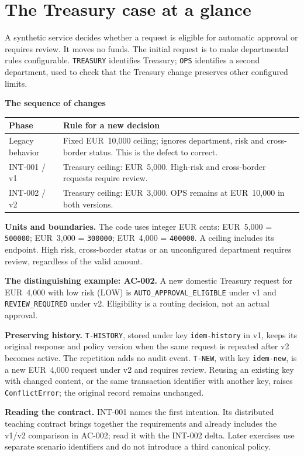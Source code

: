 \clearpage
\begingroup
\small
\section*{The Treasury case at a glance}\label{case:canonical-card}

A synthetic service decides whether a request is eligible for automatic approval or requires review. It moves no funds. The initial request is to make departmental rules configurable. \texttt{TREASURY} identifies Treasury; \texttt{OPS} identifies a second department, used to check that the Treasury change preserves other configured limits.

\noindent\textbf{The sequence of changes}
\begin{center}
\begin{tabularx}{\linewidth}{@{}p{.25\linewidth}X@{}}\toprule
Phase & Rule for a new decision\\\midrule
Legacy behavior & Fixed EUR~10,000 ceiling; ignores department, risk and cross-border status. This is the defect to correct.\\
\mbox{INT-001} / v1 & Treasury ceiling: EUR~5,000. High-risk and cross-border requests require review.\\
\mbox{INT-002} / v2 & Treasury ceiling: EUR~3,000. OPS remains at EUR~10,000 in both versions.\\\bottomrule
\end{tabularx}
\end{center}

\noindent\textbf{Units and boundaries.} The code uses integer EUR cents: EUR~5,000 = \texttt{500000}; EUR~3,000 = \texttt{300000}; EUR~4,000 = \texttt{400000}. A ceiling includes its endpoint. High risk, cross-border status or an unconfigured department requires review, regardless of the valid amount.

\noindent\textbf{The distinguishing example: \mbox{AC-002}.} A new domestic Treasury request for EUR~4,000 with low risk (LOW) is \texttt{AUTO\_APPROVAL\_ELIGIBLE} under v1 and \texttt{REVIEW\_REQUIRED} under v2. Eligibility is a routing decision, not an actual approval.

\noindent\textbf{Preserving history.} \texttt{T-HISTORY}, stored under key \texttt{idem-history} in v1, keeps its original response and policy version when the same request is repeated after v2 becomes active. The repetition adds no audit event. \texttt{T-NEW}, with key \texttt{idem-new}, is a new EUR~4,000 request under v2 and requires review. Reusing an existing key with changed content, or the same transaction identifier with another key, raises \texttt{ConflictError}; the original record remains unchanged.

\noindent\textbf{Reading the contract.} \mbox{INT-001} names the first intention. Its distributed teaching contract brings together the requirements and already includes the v1/v2 comparison in \mbox{AC-002}; read it with the \mbox{INT-002} delta. Later exercises use separate scenario identifiers and do not introduce a third canonical policy.
\endgroup
\clearpage

